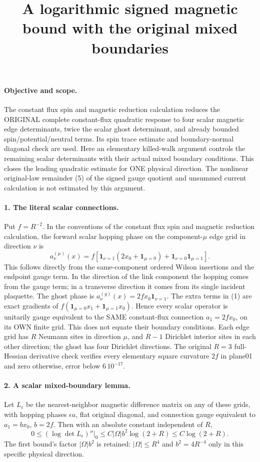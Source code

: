 \documentclass[11pt]{article}
\title{A logarithmic signed magnetic bound with the original mixed boundaries}\author{}\date{}
\begin{document}
\maketitle
\paragraph{Objective and scope.}
The constant flux spin and magnetic reduction calculation reduces the ORIGINAL complete constant-flux quadratic response to
four scalar magnetic edge determinants, twice the scalar ghost determinant,
and already bounded spin/potential/neutral terms. Its spin trace estimate
and boundary-normal diagonal check are used. Here an elementary killed-walk
argument controls the remaining scalar determinants with their actual
mixed boundary conditions. This closes the leading quadratic estimate for
ONE physical direction. The nonlinear original-law remainder (5) of the signed gauge quotient and unsummed current calculation
is not estimated by this argument.

\paragraph{1. The literal scalar connections.}
Put $f=R^{-2}$. In the conventions of the constant flux spin and magnetic reduction calculation, the forward scalar hopping
phase on the component-$\mu$ edge grid in direction $\nu$ is
\[
 a^{(\mu)}_\nu(x)=f\left[
  \mathbf1_{\nu=1}(2x_0+\mathbf1_{\mu=0})
       +\mathbf1_{\nu=0}\mathbf1_{\mu=1}\right].                    \tag{1}
\]
This follows directly from the same-component ordered Wilson insertions
and the endpoint gauge term. In the direction of the link component the
hopping comes from the gauge term; in a transverse direction it comes
from its single incident plaquette. The ghost phase is
$a^{(g)}_\nu(x)=2f x_0\mathbf1_{\nu=1}$.
The extra terms in (1) are exact gradients of
$f(\mathbf1_{\mu=0}x_1+\mathbf1_{\mu=1}x_0)$.
Hence every scalar operator is unitarily gauge equivalent to the SAME
constant-flux connection $a_1=2fx_0$, on its OWN finite grid.
This does not equate their boundary conditions. Each edge grid has $R$
Neumann sites in direction $\mu$, and $R-1$ Dirichlet interior sites in
each other direction; the ghost has four Dirichlet directions.
The original $R=3$ full-Hessian derivative check verifies every elementary
square curvature $2f$ in plane01 and zero otherwise, error below $6\,10^{-17}$.

\paragraph{2. A scalar mixed-boundary lemma.}
Let $L_\epsilon$ be the nearest-neighbor magnetic difference matrix on any
of these grids, with hopping phases $\epsilon a$, flat original diagonal,
and connection gauge equivalent to $a_1=b x_0$, $b=2f$.
Then with an absolute constant independent of $R$,
\[
 \boxed{0\le (\log\det L_\epsilon)''\big|_0
            \le C |\Omega|b^2\log(2+R)\le C\log(2+R).}             \tag{2}
\]
The first bound's factor $|\Omega|b^2$ is retained: $|\Omega|\le R^4$
and $b^2=4R^{-4}$ only in this specific physical direction.
\end{document}

